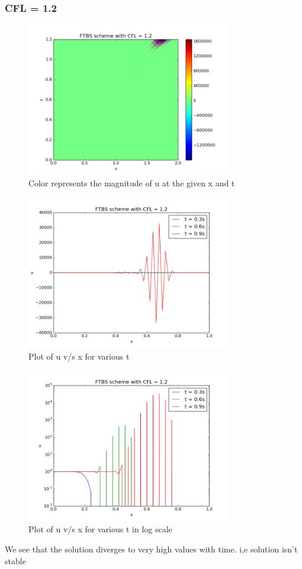 \documentclass[11pt, a4paper]{article}
\begin{document}
\subsubsection{CFL = 1.2}
\begin{figure}[H]
 \centering
 \includegraphics[width = 0.8\textwidth]{FTBS1_12.png}
 \caption{Color represents the magnitude of u at the given x and t}
\end{figure}

\begin{figure}[H]
 \centering
 \includegraphics[width = 0.8\textwidth]{FTBS1_12_1.png}
 \caption{Plot of u v/s x for various t}
\end{figure}

\begin{figure}[H]
 \centering
 \includegraphics[width = 0.8\textwidth]{FTBS1_12_1_log.png}
 \caption{Plot of u v/s x for various t in log scale}
\end{figure}
We see that the solution diverges to very high values with time. i,e solution isn't stable
\end{document}
